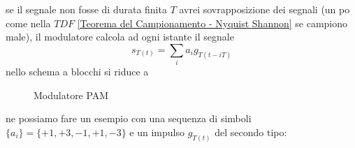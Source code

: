             se il segnale non fosse di durata finita $T$ avrei sovrapposizione dei segnali (un po come nella $TDF$ \ref{Teorema del Campionamento - Nyquist Shannon} se campiono male), il modulatore calcola ad ogni istante il segnale
            \[
                s_{T(t)} = \sum_{i}a_ig_{T(t-iT)}  
            \]
            nello schema a blocchi si riduce a
            \begin{figure}[H]
                \centering
                \caption{Modulatore PAM}
            \end{figure}
            ne possiamo fare un esempio con una sequenza di simboli $\{a_i\} = \{+1,+3,-1,+1,-3\}$ e un impulso $g_{T(t)}$ del secondo tipo:

